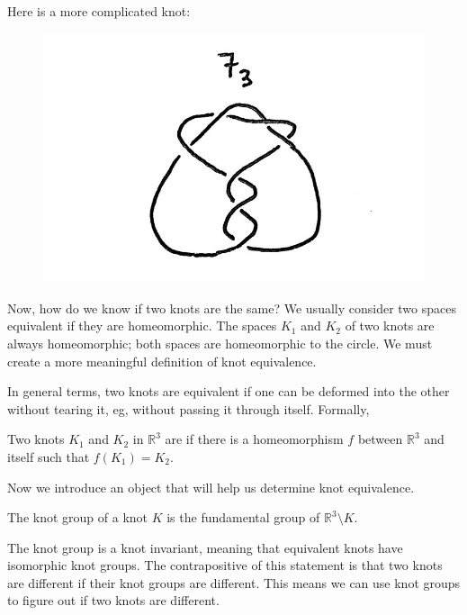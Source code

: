Here is a more complicated knot:
\begin{figure}[H]
\centering
\includegraphics[scale=0.2]{figures/knot73.jpg}
\end{figure}

\noindent Now, how do we know if two knots are the same? We usually consider two spaces equivalent if they are homeomorphic. The spaces $K_1$ and $K_2$ of two knots are always homeomorphic; both spaces are homeomorphic to the circle. We must create a more meaningful definition of knot equivalence.

\noindent In general terms, two knots are equivalent if one can be deformed into the other without tearing it, eg, without passing it through itself. Formally,

\begin{definition}
Two knots $K_1$ and $K_2$ in $\mathbb{R}^3$ are  if there is a homeomorphism $f$ between $\mathbb{R}^3$ and itself such that $f(K_1) = K_2$.
\end{definition}

\noindent Now we introduce an object that will help us determine knot equivalence.
\begin{definition}
The knot group of a knot $K$ is the fundamental group of $\mathbb{R}^3\setminus{K}$.
\end{definition}
\noindent The knot group is a knot invariant, meaning that equivalent knots have isomorphic knot groups. The contrapositive of this statement is that two knots are different if their knot groups are different. This means we can use knot groups to figure out if two knots are different.